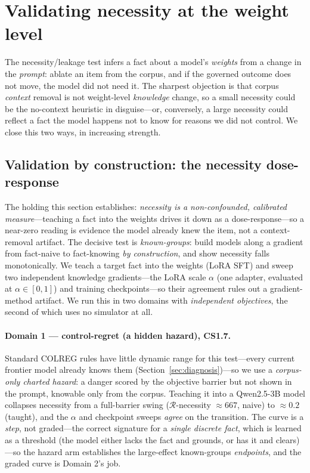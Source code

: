 \documentclass{article}
\newcommand{\regret}{\mathcal{R}}
\begin{document}
\section{Validating necessity at the weight level}
\label{sec:weightlevel}
The necessity/leakage test infers a fact about a model's \emph{weights} from a change in the
\emph{prompt}: ablate an item from the corpus, and if the governed outcome does not move, the
model did not need it. The sharpest objection is that corpus \emph{context} removal is not
weight-level \emph{knowledge} change, so a small necessity could be the no-context heuristic in
disguise---or, conversely, a large necessity could reflect a fact the model happens not to know
for reasons we did not control. We close this two ways, in increasing strength.

\subsection{Validation by construction: the necessity dose-response}
\label{sec:construction}
The holding this section establishes: \emph{necessity is a non-confounded, calibrated measure}---teaching
a fact into the weights drives it down as a dose-response---so a near-zero reading is evidence the model
already knew the item, not a context-removal artifact. The decisive test is \emph{known-groups}: build
models along a gradient from fact-naive to
fact-knowing \emph{by construction}, and show necessity falls monotonically. We teach a target
fact into the weights (LoRA SFT) and sweep two independent knowledge gradients---the LoRA scale
$\alpha$ (one adapter, evaluated at $\alpha\in[0,1]$) and training checkpoints---so their
agreement rules out a gradient-method artifact. We run this in two domains with \emph{independent
objectives}, the second of which uses no simulator at all.

\paragraph{Domain 1 --- control-regret (a hidden hazard), CS1.7.} Standard COLREG rules have little dynamic
range for this test---every current frontier model already knows them (Section~\ref{sec:diagnosis})---so we
use a \emph{corpus-only charted hazard}: a danger scored by the objective barrier but not shown in
the prompt, knowable only from the corpus. Teaching it into a Qwen2.5-3B model collapses necessity
from a full-barrier swing ($\regret$-necessity $\approx 667$, naive) to $\approx 0.2$ (taught), and
the $\alpha$ and checkpoint sweeps \emph{agree} on the transition. The curve is a \emph{step}, not
graded---the correct signature for a \emph{single discrete fact}, which is learned as a threshold
(the model either lacks the fact and grounds, or has it and clears)---so the hazard arm establishes
the large-effect known-groups \emph{endpoints}, and the graded curve is Domain 2's job.
\end{document}
